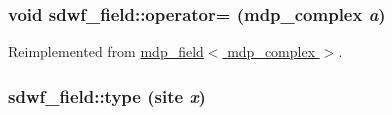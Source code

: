 \label{classsdwf__field_a18764312ba3bb72577b2e29429854024}
\hypertarget{classsdwf__field_ac9bbccf6442b9f1a1a07b18fd2fe442c}{
\subsubsection[{operator=}]{\setlength{\rightskip}{0pt plus 5cm}void sdwf\_\-field::operator= ({\bf mdp\_\-complex} {\em a})}}
\label{classsdwf__field_ac9bbccf6442b9f1a1a07b18fd2fe442c}


Reimplemented from \hyperlink{classmdp__field_a24364bce6444668661a0688632af87ec}{mdp\_\-field$<$ mdp\_\-complex $>$}.\hypertarget{classsdwf__field_a7227345aef0414528513479dad854568}{
\subsubsection[{type}]{ sdwf\_\-field::type (site {\em x})}}
\label{classsdwf__field_a7227345aef0414528513479dad854568}


